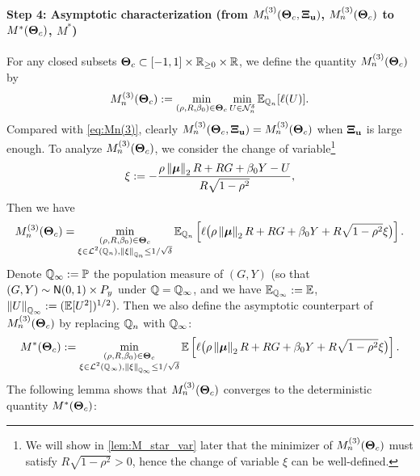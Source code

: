 \paragraph{Step 4: Asymptotic characterization (from $M_n^{(3)}(\text{\boldmath $\Theta$}_{c}, \text{\boldmath $\Xi$}_{\mathrm{\bf u}})$, $M_n^{(3)}(\text{\boldmath $\Theta$}_{c})$ to $M^*(\text{\boldmath $\Theta$}_{c})$, $M^*$)}
For any closed subsets $\text{\boldmath $\Theta$}_{c} \subset [-1, 1] \times \mathbb{R}_{\ge 0} \times \mathbb{R}$, we define the quantity $M_n^{(3)}(\text{\boldmath $\Theta$}_{c})$ by 
\begin{equation*}
    M_n^{(3)}(\text{\boldmath $\Theta$}_{c}) 
        :=  
        \min_{ (\rho, R, \beta_0) \in \text{\boldmath $\Theta$}_{c} } 
        \min_{ U \in \mathcal{N}^\delta_n }
        \mathbb{E}_{\mathbb{Q}_n}[\ell(U)].
\end{equation*}
Compared with \cref{eq:Mn(3)}, clearly $M_n^{(3)}(\text{\boldmath $\Theta$}_{c}, \text{\boldmath $\Xi$}_{\mathrm{\bf u}}) = M_n^{(3)}(\text{\boldmath $\Theta$}_{c})$ when $\text{\boldmath $\Xi$}_{\mathrm{\bf u}}$ is large enough. To analyze $M_n^{(3)}(\text{\boldmath $\Theta$}_{c})$, we consider the change of variable\footnote{
We will show in \cref{lem:M_star_var} later that the minimizer of $M_n^{(3)}(\text{\boldmath $\Theta$}_{c})$ must satisfy $R \sqrt{1 - \rho^2} > 0$, hence the change of variable $\xi$ can be well-defined.
}
\begin{equation*}
    \xi := - \frac{\rho\left\|{{\boldsymbol{\mu}}}\right\|_2 R + RG + \beta_0 Y - U}{R\sqrt{1 - \rho^2}},
\end{equation*}
Then we have
\begin{equation*}
        M_n^{(3)}(\text{\boldmath $\Theta$}_{c})
    = \min_{ \substack{ (\rho, R, \beta_0) \in \text{\boldmath $\Theta$}_{c} \\ \xi \in \mathcal{L}^2(\mathbb{Q}_n), \left\|{\xi}\right\|_{\mathbb{Q}_n} \le 1/\sqrt{\delta} } } 
    \mathbb{E}_{\mathbb{Q}_n} \left[ \ell \bigl( \rho\left\|{{\boldsymbol{\mu}}}\right\|_2 R + RG + \beta_0 Y + R\sqrt{1 - \rho^2} \xi \bigr) \right].
\end{equation*}
Denote $\mathbb{Q}_\infty := \mathbb{P}$ the population measure of $(G, Y)$ (so that $(G, Y) \sim {\sf N}(0, 1) \times P_y$ under $\mathbb{Q} = \mathbb{Q}_\infty$, and we have $\mathbb{E}_{\mathbb{Q}_\infty} := \mathbb{E}$, $\left\|{U}\right\|_{\mathbb{Q}_\infty} := (\mathbb{E}[U^2])^{1/2}$). Then we also define the asymptotic counterpart of $M_n^{(3)}(\text{\boldmath $\Theta$}_{c})$ by replacing $\mathbb{Q}_n$ with $\mathbb{Q}_\infty$:
\begin{equation*}
    M^{*}(\text{\boldmath $\Theta$}_{c})
    := \min_{ \substack{ (\rho, R, \beta_0) \in \text{\boldmath $\Theta$}_{c} \\ \xi \in \mathcal{L}^2(\mathbb{Q}_\infty), \left\|{\xi}\right\|_{\mathbb{Q}_\infty} \le 1/\sqrt{\delta} } } 
    \mathbb{E} \left[ \ell \bigl( \rho\left\|{{\boldsymbol{\mu}}}\right\|_2 R + RG + \beta_0 Y + R\sqrt{1 - \rho^2} \xi \bigr) \right].
\end{equation*}
The following lemma shows that $M_n^{(3)}(\text{\boldmath $\Theta$}_{c})$ converges to the deterministic quantity $M^{*}(\text{\boldmath $\Theta$}_{c})$:

